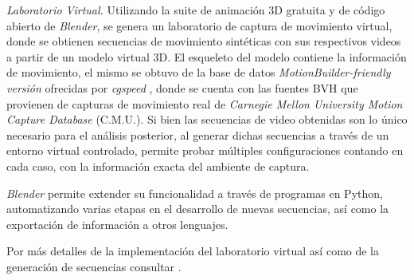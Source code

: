 \textit{Laboratorio Virtual.} Utilizando la suite de animación 3D gratuita y de código abierto de \textit{Blender}, se genera un laboratorio de captura de movimiento virtual, donde se obtienen secuencias de movimiento sintéticas con sus respectivos videos a partir de un modelo virtual 3D. El esqueleto del modelo contiene la información de movimiento, el mismo se obtuvo de la base de datos \textit{MotionBuilder-friendly versión} ofrecidas por \textit{cgspeed} \cite{cgspeed}, 
donde se cuenta con las fuentes BVH que provienen de capturas de movimiento real de \textit{Carnegie Mellon University Motion Capture Database} (C.M.U.). Si bien las secuencias de video obtenidas son lo único necesario para el análisis posterior, al generar dichas secuencias a través de un entorno virtual controlado, permite probar múltiples configuraciones contando en cada caso, con la información exacta del ambiente de captura.

\textit{Blender} permite extender su funcionalidad a través de programas en Python, automatizando varias etapas en el desarrollo de nuevas secuencias, así como la exportación de información a otros lenguajes.

Por más detalles de la implementación del laboratorio virtual así como de la generación de secuencias consultar \cite{proyecto_biomecanica}.
%
%
%
%
%
%
       
